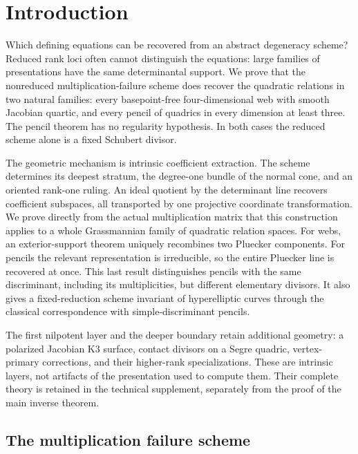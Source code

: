 \section{Introduction}
\label{sec:introduction-v132}

Which defining equations can be recovered from an abstract degeneracy
scheme?  Reduced rank loci often cannot distinguish the equations:
large families of presentations have the same determinantal support.
We prove that the nonreduced multiplication-failure scheme does
recover the quadratic relations in two natural families: every
basepoint-free four-dimensional web with smooth Jacobian quartic,
and every pencil of quadrics in every dimension at least three.
The pencil theorem has no regularity hypothesis.  In both cases the
reduced scheme alone is a fixed Schubert divisor.

The geometric mechanism is intrinsic coefficient extraction.  The
scheme determines its deepest stratum, the degree-one bundle of the
normal cone, and an oriented rank-one ruling.  An ideal quotient by
the determinant line recovers coefficient subspaces, all transported
by one projective coordinate transformation.  We prove directly from
the actual multiplication matrix that this construction applies to
a whole Grassmannian family of quadratic relation spaces.  For webs,
an exterior-support theorem uniquely recombines two Pluecker
components.  For pencils the relevant representation is irreducible,
so the entire Pluecker line is recovered at once.  This last result
distinguishes pencils with the same discriminant, including its
multiplicities, but different elementary divisors.  It also gives a
fixed-reduction scheme invariant of hyperelliptic curves through the
classical correspondence with simple-discriminant pencils.

The first nilpotent layer and the deeper boundary retain additional
geometry: a polarized Jacobian K3 surface, contact divisors on a Segre
quadric, vertex-primary corrections, and their higher-rank
specializations.  These are intrinsic layers, not artifacts of the
presentation used to compute them.  Their complete theory is retained
in the technical supplement, separately from the proof of the main
inverse theorem.

\subsection{The multiplication failure scheme}

